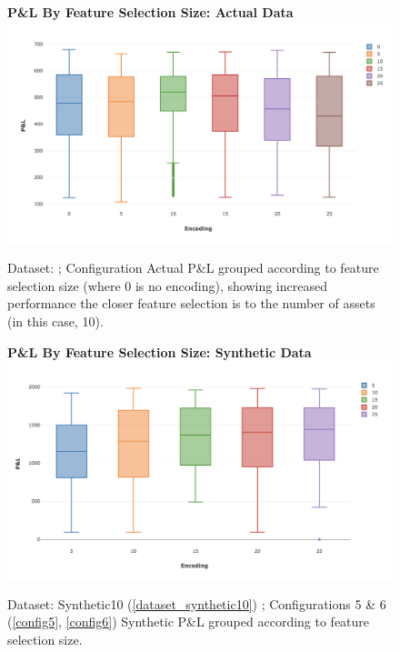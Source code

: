 \documentclass[a4paper,11pt,oneside]{article}
\theoremstyle{plain}
\theoremstyle{definition}
\begin{document}

\begin{figure}[H]
	\centering 
	\textbf{P\&L By Feature Selection Size: Actual Data}
	\includegraphics[scale=0.35]{images/results/feature_selection/actual_encoding_profits.png} 
	\caption{Dataset: ; Configuration 
		\newline Actual P\&L grouped according to feature selection size (where 0 is no encoding), showing increased performance the closer feature selection is to the number of assets (in this case, 10).}
	\label{figure-results_encoding_actual}
\end{figure}

\begin{figure}[H]
	\centering 
	\textbf{P\&L By Feature Selection Size: Synthetic Data}
	\includegraphics[scale=0.35]{images/results/feature_selection/synthetic_encoding_profits.png} 
	\caption{Dataset: Synthetic10 (\ref{dataset_synthetic10}) ; Configurations 5 \& 6 (\ref{config5}, \ref{config6})
		\newline Synthetic P\&L grouped according to feature selection size.}
	\label{figure-results_encoding_synthetic}
\end{figure}
\end{document}
